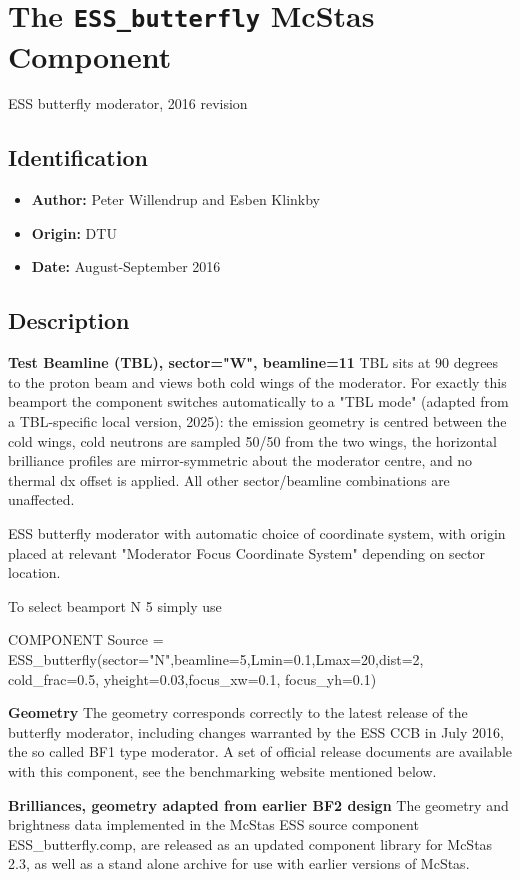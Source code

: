 \section{The \texttt{ESS\_butterfly} McStas Component}
ESS butterfly moderator, 2016 revision

\subsection*{Identification}
\begin{itemize}
  \item \textbf{Author:} Peter Willendrup and Esben Klinkby
  \item \textbf{Origin:} DTU
  \item \textbf{Date:} August-September 2016
\end{itemize}

\subsection*{Description}
\textbf{Test Beamline (TBL), sector="W", beamline=11} TBL sits at 90 degrees to the proton beam and views both cold wings of the moderator. For exactly this beamport the component switches automatically to a "TBL mode" (adapted from a TBL-specific local version, 2025): the emission geometry is centred between the cold wings, cold neutrons are sampled 50/50 from the two wings, the horizontal brilliance profiles are mirror-symmetric about the moderator centre, and no thermal dx offset is applied. All other sector/beamline combinations are unaffected.

ESS butterfly moderator with automatic choice of coordinate system, with origin placed at relevant "Moderator Focus Coordinate System" depending on sector location.

To select beamport N 5 simply use

COMPONENT Source = ESS\_butterfly(sector="N",beamline=5,Lmin=0.1,Lmax=20,dist=2, cold\_frac=0.5, yheight=0.03,focus\_xw=0.1, focus\_yh=0.1)

\textbf{Geometry} The geometry corresponds correctly to the latest release of the butterfly moderator, including changes warranted by the ESS CCB in July 2016, the so called BF1 type moderator. A set of official release documents are available with this component, see the benchmarking website mentioned below.

\textbf{Brilliances, geometry adapted from earlier BF2 design} The geometry and brightness data implemented in the McStas ESS source component ESS\_butterfly.comp, are released as an updated component library for McStas 2.3, as well as a stand alone archive for use with earlier versions of McStas.

